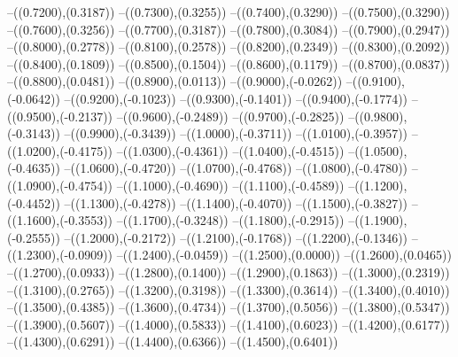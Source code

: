 {	--({\sx*(0.7200)},{\sy*(0.3187)})
	--({\sx*(0.7300)},{\sy*(0.3255)})
	--({\sx*(0.7400)},{\sy*(0.3290)})
	--({\sx*(0.7500)},{\sy*(0.3290)})
	--({\sx*(0.7600)},{\sy*(0.3256)})
	--({\sx*(0.7700)},{\sy*(0.3187)})
	--({\sx*(0.7800)},{\sy*(0.3084)})
	--({\sx*(0.7900)},{\sy*(0.2947)})
	--({\sx*(0.8000)},{\sy*(0.2778)})
	--({\sx*(0.8100)},{\sy*(0.2578)})
	--({\sx*(0.8200)},{\sy*(0.2349)})
	--({\sx*(0.8300)},{\sy*(0.2092)})
	--({\sx*(0.8400)},{\sy*(0.1809)})
	--({\sx*(0.8500)},{\sy*(0.1504)})
	--({\sx*(0.8600)},{\sy*(0.1179)})
	--({\sx*(0.8700)},{\sy*(0.0837)})
	--({\sx*(0.8800)},{\sy*(0.0481)})
	--({\sx*(0.8900)},{\sy*(0.0113)})
	--({\sx*(0.9000)},{\sy*(-0.0262)})
	--({\sx*(0.9100)},{\sy*(-0.0642)})
	--({\sx*(0.9200)},{\sy*(-0.1023)})
	--({\sx*(0.9300)},{\sy*(-0.1401)})
	--({\sx*(0.9400)},{\sy*(-0.1774)})
	--({\sx*(0.9500)},{\sy*(-0.2137)})
	--({\sx*(0.9600)},{\sy*(-0.2489)})
	--({\sx*(0.9700)},{\sy*(-0.2825)})
	--({\sx*(0.9800)},{\sy*(-0.3143)})
	--({\sx*(0.9900)},{\sy*(-0.3439)})
	--({\sx*(1.0000)},{\sy*(-0.3711)})
	--({\sx*(1.0100)},{\sy*(-0.3957)})
	--({\sx*(1.0200)},{\sy*(-0.4175)})
	--({\sx*(1.0300)},{\sy*(-0.4361)})
	--({\sx*(1.0400)},{\sy*(-0.4515)})
	--({\sx*(1.0500)},{\sy*(-0.4635)})
	--({\sx*(1.0600)},{\sy*(-0.4720)})
	--({\sx*(1.0700)},{\sy*(-0.4768)})
	--({\sx*(1.0800)},{\sy*(-0.4780)})
	--({\sx*(1.0900)},{\sy*(-0.4754)})
	--({\sx*(1.1000)},{\sy*(-0.4690)})
	--({\sx*(1.1100)},{\sy*(-0.4589)})
	--({\sx*(1.1200)},{\sy*(-0.4452)})
	--({\sx*(1.1300)},{\sy*(-0.4278)})
	--({\sx*(1.1400)},{\sy*(-0.4070)})
	--({\sx*(1.1500)},{\sy*(-0.3827)})
	--({\sx*(1.1600)},{\sy*(-0.3553)})
	--({\sx*(1.1700)},{\sy*(-0.3248)})
	--({\sx*(1.1800)},{\sy*(-0.2915)})
	--({\sx*(1.1900)},{\sy*(-0.2555)})
	--({\sx*(1.2000)},{\sy*(-0.2172)})
	--({\sx*(1.2100)},{\sy*(-0.1768)})
	--({\sx*(1.2200)},{\sy*(-0.1346)})
	--({\sx*(1.2300)},{\sy*(-0.0909)})
	--({\sx*(1.2400)},{\sy*(-0.0459)})
	--({\sx*(1.2500)},{\sy*(0.0000)})
	--({\sx*(1.2600)},{\sy*(0.0465)})
	--({\sx*(1.2700)},{\sy*(0.0933)})
	--({\sx*(1.2800)},{\sy*(0.1400)})
	--({\sx*(1.2900)},{\sy*(0.1863)})
	--({\sx*(1.3000)},{\sy*(0.2319)})
	--({\sx*(1.3100)},{\sy*(0.2765)})
	--({\sx*(1.3200)},{\sy*(0.3198)})
	--({\sx*(1.3300)},{\sy*(0.3614)})
	--({\sx*(1.3400)},{\sy*(0.4010)})
	--({\sx*(1.3500)},{\sy*(0.4385)})
	--({\sx*(1.3600)},{\sy*(0.4734)})
	--({\sx*(1.3700)},{\sy*(0.5056)})
	--({\sx*(1.3800)},{\sy*(0.5347)})
	--({\sx*(1.3900)},{\sy*(0.5607)})
	--({\sx*(1.4000)},{\sy*(0.5833)})
	--({\sx*(1.4100)},{\sy*(0.6023)})
	--({\sx*(1.4200)},{\sy*(0.6177)})
	--({\sx*(1.4300)},{\sy*(0.6291)})
	--({\sx*(1.4400)},{\sy*(0.6366)})
	--({\sx*(1.4500)},{\sy*(0.6401)})
}
